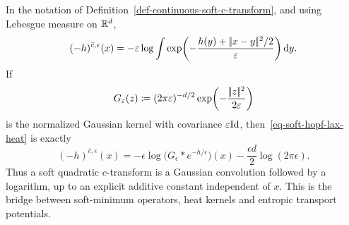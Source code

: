 In the notation of Definition~\ref{def-continuous-soft-c-transform}, and using Lebesgue measure on $\mathbb{R}^d$,
\begin{equation}\label{eq-soft-hopf-lax-heat}
(-h)^{\bar c,\varepsilon}(x)
=
-\varepsilon\log
\int
\exp\!\left(
-\frac{h(y)+|\!| x-y |\!|^2/2}{\varepsilon}
\right)\mathrm{d} y.
\end{equation}
If
\[
G_\varepsilon(z)\coloneqq (2\pi\varepsilon)^{-d/2}\exp\!\left(-\frac{|\!| z |\!|^2}{2\varepsilon}\right)
\]
is the normalized Gaussian kernel with covariance $\varepsilon\mathrm{Id}$, then~\eqref{eq-soft-hopf-lax-heat} is exactly
\begin{equation}\label{eq-soft-c-transform-gaussian-convolution}
(-h)^{\bar c,\epsilon}(x)
=
-\epsilon\log\Big(G_\epsilon\ast e^{-h/\epsilon}\Big)(x)
-\frac{\epsilon d}{2}\log(2\pi\epsilon).
\end{equation}
Thus a soft quadratic $c$-transform is a Gaussian convolution followed by a logarithm, up to an explicit additive constant independent of $x$. This is the bridge between soft-minimum operators, heat kernels and entropic transport potentials.

